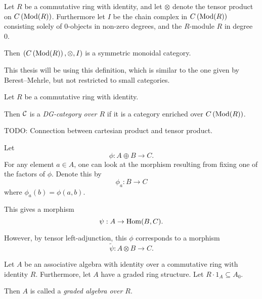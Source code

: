 \begin{fact}[nlab]
    Let \( R \) be a commutative ring with identity, and let \( \otimes \) denote the tensor product on \( C \left( \operatorname{Mod}(R) \right) \). Furthermore let \( I \) be the chain complex in \( C \left( \operatorname{Mod}(R) \right) \) consisting solely of \( 0 \)-objects in non-zero degrees, and the \( R \)-module \( R \) in degree 0. 

    Then \( \left( C \left( \operatorname{Mod}(R) \right), \otimes, I \right) \) is a symmetric monoidal category.
\end{fact}

This thesis will be using this definition, which is similar to the one given by Berest--Mehrle, but not restricted to small categories.
\begin{definition}
    Let \( R \) be a commutative ring with identity.

    Then \( {\mathcal{C}} \) is a \emph{DG-category over \( R \)} if it is a category enriched over \( C \left( \operatorname{Mod}(R) \right) \).
\end{definition}

\begin{remark}
    TODO: Connection between cartesian product and tensor product.

    Let
    \[
        \phi: A \oplus B \to C.
    \]
    For any element \( a \in A \), one can look at the morphism resulting from fixing one of the factors of \( \phi \). Denote this by
    \[
        \phi_a: B \to C
    \]
    where \( \phi_a(b) = \phi(a, b) \).
    
    This gives a morphism
    \[
        \psi: A \to \operatorname{Hom}(B, C).
    \]

    However, by tensor left-adjunction, this \( \phi \) corresponds to a morphism
    \[
        \tilde{\psi}: A \otimes B \to C.
    \]
\end{remark}

\begin{definition}
    Let \( A \) be an associative algebra with identity over a commutative ring with identity \( R \). Furthermore, let \( A \) have a graded ring structure. Let \( R \cdot 1_A \subseteq A_0 \).

    Then \( A \) is called a \emph{graded algebra over \( R \)}.
\end{definition}

